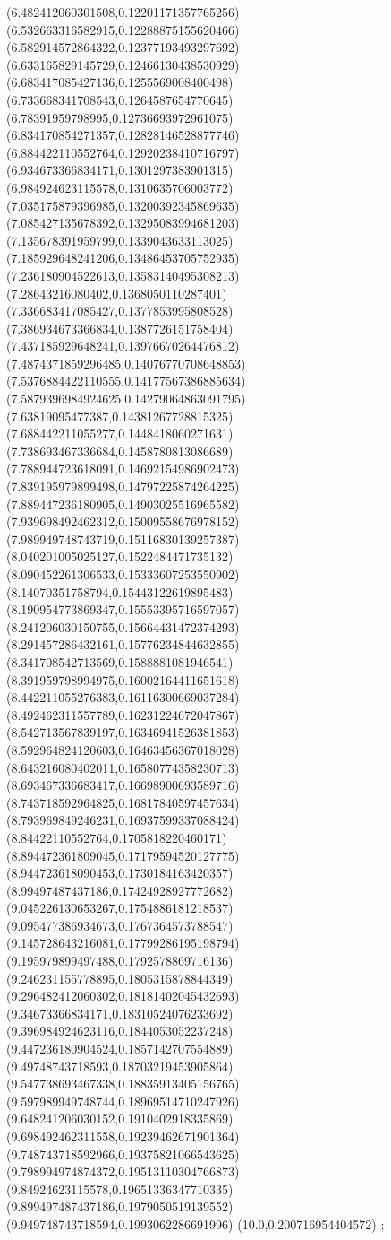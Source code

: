 {(6.482412060301508,0.12201171357765256)
(6.532663316582915,0.12288875155620466)
(6.582914572864322,0.12377193493297692)
(6.633165829145729,0.12466130438530929)
(6.683417085427136,0.1255569008400498)
(6.733668341708543,0.1264587654770645)
(6.78391959798995,0.12736693972961075)
(6.834170854271357,0.12828146528877746)
(6.884422110552764,0.12920238410716797)
(6.934673366834171,0.1301297383901315)
(6.984924623115578,0.1310635706003772)
(7.035175879396985,0.13200392345869635)
(7.085427135678392,0.13295083994681203)
(7.135678391959799,0.1339043633113025)
(7.185929648241206,0.13486453705752935)
(7.236180904522613,0.13583140495308213)
(7.28643216080402,0.1368050110287401)
(7.336683417085427,0.1377853995808528)
(7.386934673366834,0.1387726151758404)
(7.437185929648241,0.13976670264476812)
(7.4874371859296485,0.14076770708648853)
(7.5376884422110555,0.14177567386885634)
(7.5879396984924625,0.14279064863091795)
(7.63819095477387,0.14381267728815325)
(7.688442211055277,0.1448418060271631)
(7.738693467336684,0.1458780813086689)
(7.788944723618091,0.14692154986902473)
(7.839195979899498,0.14797225874264225)
(7.889447236180905,0.14903025516965582)
(7.939698492462312,0.15009558676978152)
(7.989949748743719,0.15116830139257387)
(8.040201005025127,0.1522484471735132)
(8.090452261306533,0.15333607253550902)
(8.14070351758794,0.15443122619895483)
(8.190954773869347,0.15553395716597057)
(8.241206030150755,0.15664431472374293)
(8.291457286432161,0.15776234844632855)
(8.341708542713569,0.1588881081946541)
(8.391959798994975,0.16002164411651618)
(8.442211055276383,0.16116300669037284)
(8.492462311557789,0.16231224672047867)
(8.542713567839197,0.16346941526381853)
(8.592964824120603,0.16463456367018028)
(8.643216080402011,0.16580774358230713)
(8.693467336683417,0.16698900693589716)
(8.743718592964825,0.16817840597457634)
(8.793969849246231,0.16937599337088424)
(8.84422110552764,0.1705818220460171)
(8.894472361809045,0.17179594520127775)
(8.944723618090453,0.1730184163420357)
(8.99497487437186,0.17424928927772682)
(9.045226130653267,0.1754886181218537)
(9.095477386934673,0.1767364573788547)
(9.145728643216081,0.17799286195198794)
(9.195979899497488,0.1792578869716136)
(9.246231155778895,0.1805315878844349)
(9.296482412060302,0.18181402045432693)
(9.34673366834171,0.18310524076233692)
(9.396984924623116,0.1844053052237248)
(9.447236180904524,0.1857142707554889)
(9.49748743718593,0.18703219453905864)
(9.547738693467338,0.18835913405156765)
(9.597989949748744,0.18969514710247926)
(9.648241206030152,0.1910402918335869)
(9.698492462311558,0.19239462671901364)
(9.748743718592966,0.19375821066543625)
(9.798994974874372,0.19513110304766873)
(9.84924623115578,0.19651336347710335)
(9.899497487437186,0.1979050519139552)
(9.949748743718594,0.1993062286691996)
(10.0,0.200716954404572)
};
